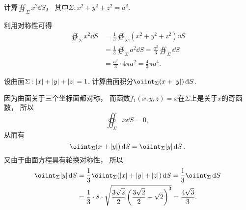 \begin{example}
计算\(\oiint_\Sigma x^2 \dd{S}\)，
其中\(\Sigma: x^2+y^2+z^2=a^2\).
\begin{solution}
利用对称性可得\begin{align*}
	\oiint_\Sigma x^2 \dd{S}
	&= \frac{1}{3} \oiint_\Sigma (x^2+y^2+z^2) \dd{S} \\
	&= \frac{1}{3} \oiint_\Sigma a^2 \dd{S}
	= \frac{a^2}{3} \oiint_\Sigma \dd{S} \\
	&= \frac{a^2}{3} \cdot 4\pi a^2
	= \frac{4}{3} \pi a^4.
\end{align*}
\end{solution}
\end{example}

\begin{example}
设曲面\(\Sigma: \abs{x}+\abs{y}+\abs{z}=1\).
计算曲面积分\(\oiint_\Sigma (x+\abs{y}) \dd{S}\).
\begin{solution}
因为曲面关于三个坐标面都对称，
而函数\(f_1(x,y,z) = x\)在\(\Sigma\)上是关于\(x\)的奇函数，
所以\[
	\oiint_\Sigma x \dd{S} = 0,
\]
从而有\[
	\oiint_\Sigma (x+\abs{y}) \dd{S}
	= \oiint_\Sigma \abs{y} \dd{S}.
\]
又由于曲面方程具有轮换对称性，
所以\begin{align*}
	\oiint_\Sigma \abs{y} \dd{S}
	&= \frac13 \oiint_\Sigma (\abs{x}+\abs{y}+\abs{z}) \dd{S}
	= \frac13 \oiint_\Sigma \dd{S} \\
	&= \frac13 \cdot 8 \cdot \sqrt{\frac{3\sqrt2}2 \left( \frac{3\sqrt2}2 - \sqrt2 \right)^3}
	= \frac{4\sqrt3}3.
\end{align*}
\end{solution}
\end{example}
